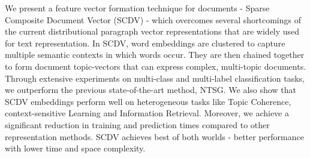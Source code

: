 We present a feature vector formation technique for documents - Sparse Composite Document Vector (SCDV) - which overcomes several shortcomings of the current distributional paragraph vector representations that are widely used for text representation. In SCDV, word embeddings are clustered to capture multiple semantic contexts in which words occur. They are then chained together to form document topic-vectors that can express complex, multi-topic documents. Through extensive experiments on multi-class and multi-label classification tasks, we outperform the previous state-of-the-art method, NTSG. We also show that SCDV embeddings perform well on heterogeneous tasks like Topic Coherence, context-sensitive Learning and Information Retrieval. Moreover, we achieve a significant reduction in training and prediction times compared to other representation methods. SCDV achieves best of both worlds - better performance with lower time and space complexity.
